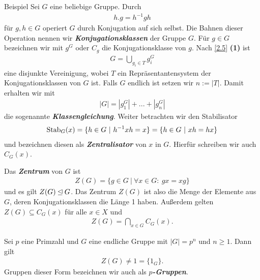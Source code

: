 \begin{genericdf}{Beispiel}\label{2.8}   
Sei $G$ eine beliebige Gruppe. Durch 
\begin{align*}
h.g = h^{-1} g h 
\end{align*}
für $g,h \in G$ operiert $G$ durch Konjugation auf sich selbst.
Die Bahnen dieser Operation nennen wir \textbf{\textit{Konjugationsklassen}} der Gruppe $G$.
Für $g \in G $ bezeichnen wir mit $g^G$ oder $C_g$ die Konjugationsklasse von $g$.
Nach \ref{2.5} \textbf{(1)} ist
\begin{align*}
G =  \bigcup\limits_{g_i \in T} g_i^G
\end{align*}
eine disjunkte Vereinigung, wobei $T$ ein Repräsentantensystem der Konjugationsklassen von $G$ ist.
Falls $G$ endlich ist setzen wir $n := |T|$. Damit erhalten wir mit
\begin{align*}
|G| = |g_1^G| + ... + |g_n^G|
\end{align*}
die sogenannte \textbf{\textit{Klassengleichung}}. Weiter betrachten wir den Stabilisator
\begin{align*}
\operatorname{Stab}_G(x) = \lbrace h \in G \ | \ h^{-1} x h = x \rbrace =\lbrace h \in G \ | \ x h = h x \rbrace
\end{align*}
und bezeichnen diesen als \textbf{\textit{Zentralisator}} von $x$ in $G$.
Hierfür schreiben wir auch $C_G(x)$.
\end{genericdf}

\begin{df}\label{2.9} 
Das \textbf{\textit{Zentrum}} von $G$ ist
\begin{align*}
Z(G) = \lbrace g \in G \ | \ \forall x \in G : \ gx = xg \rbrace
\end{align*}
und es gilt $Z(G) \unlhd G$.
Das Zentrum $Z(G)$ ist also die Menge der Elemente aus $G$, deren Konjugationsklassen die Länge 1 haben.
Außerdem gelten $Z(G) \subseteq C_G(x)$ für alle $x \in X$ und 
\begin{align*}
Z(G) = \bigcap\limits_{x \in G } C_G(x).
\end{align*}
\end{df}

\begin{sz}\label{skript:2.10} 
Sei $p$ eine Primzahl und $G$ eine endliche Gruppe mit $|G| = p^n$ und $n \geq 1$.
Dann gilt
\begin{align*}
Z(G) \neq 1 = \lbrace 1_G \rbrace.
\end{align*}
Gruppen dieser Form bezeichnen wir auch als \textbf{\textit{$p$-Gruppen}}.
\end{sz}

